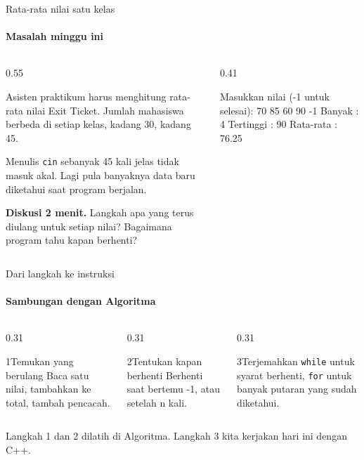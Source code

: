 \documentclass[t]{beamer}
\begin{document}

\begin{frame}[fragile]{Rata-rata nilai satu kelas}
\framesubtitle{Masalah minggu ini}
\begin{columns}[T]
\begin{column}{0.55\textwidth}
{Asisten praktikum harus menghitung rata-rata nilai Exit Ticket. Jumlah mahasiswa berbeda di setiap kelas, kadang 30, kadang 45.

\vspace{6pt}
Menulis \texttt{cin} sebanyak 45 kali jelas tidak masuk akal. Lagi pula banyaknya data baru diketahui saat program berjalan.\par}
\vspace{6pt}
\begin{Catatan}
\textbf{Diskusi 2 menit.} Langkah apa yang terus diulang untuk setiap nilai? Bagaimana program tahu kapan berhenti?
\end{Catatan}
\end{column}
\begin{column}{0.41\textwidth}
\begin{Keluaran}[]
Masukkan nilai (-1 untuk selesai):
70 85 60 90 -1
Banyak    : 4
Tertinggi : 90
Rata-rata : 76.25
\end{Keluaran}
\end{column}
\end{columns}
\end{frame}

\begin{frame}{Dari langkah ke instruksi}
\framesubtitle{Sambungan dengan Algoritma}
\begin{columns}[T]
\begin{column}{0.31\textwidth}
\begin{Langkah}{1}{Temukan yang berulang}
Baca satu nilai, tambahkan ke total, tambah pencacah.
\end{Langkah}
\end{column}
\begin{column}{0.31\textwidth}
\begin{Langkah}{2}{Tentukan kapan berhenti}
Berhenti saat bertemu -1, atau setelah n kali.
\end{Langkah}
\end{column}
\begin{column}{0.31\textwidth}
\begin{Langkah}{3}{Terjemahkan}
\texttt{while} untuk syarat berhenti, \texttt{for} untuk banyak putaran yang sudah diketahui.
\end{Langkah}
\end{column}
\end{columns}
\vspace{10pt}
Langkah 1 dan 2 dilatih di Algoritma. Langkah 3 kita kerjakan hari ini dengan C++.
\end{frame}
\end{document}
